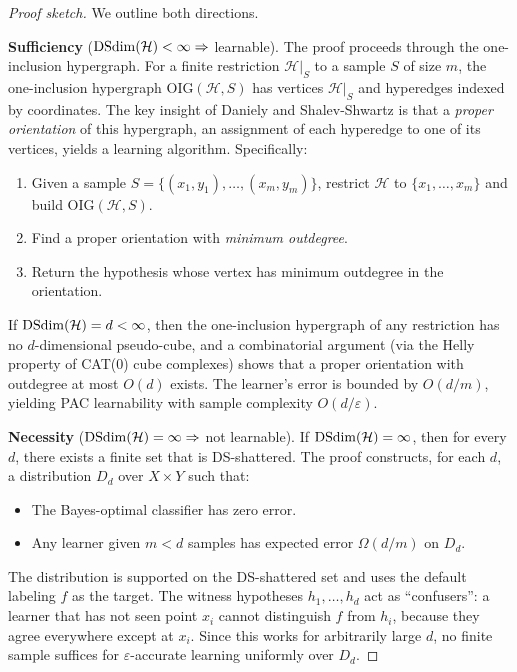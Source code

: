 \begin{proof}[Proof sketch]
We outline both directions.

\medskip\noindent
\textbf{Sufficiency} ($\mathrm{DSdim}(\mathcal{H}) < \infty \Rightarrow$ learnable).
The proof proceeds through the one-inclusion hypergraph.  For a finite
restriction $\mathcal{H}|_S$ to a sample $S$ of size $m$, the one-inclusion
hypergraph $\mathrm{OIG}(\mathcal{H}, S)$ has vertices $\mathcal{H}|_S$ and
hyperedges indexed by coordinates.  The key insight of Daniely and
Shalev-Shwartz is that a \emph{proper orientation} of this hypergraph, an
assignment of each hyperedge to one of its vertices, yields a learning
algorithm.  Specifically:

\begin{enumerate}[leftmargin=*,nosep]
\item Given a sample $S = \{(x_1, y_1), \ldots, (x_m, y_m)\}$, restrict
  $\mathcal{H}$ to $\{x_1, \ldots, x_m\}$ and build $\mathrm{OIG}(\mathcal{H}, S)$.
\item Find a proper orientation with \emph{minimum outdegree}.
\item Return the hypothesis whose vertex has minimum outdegree in the
  orientation.
\end{enumerate}

If $\mathrm{DSdim}(\mathcal{H}) = d < \infty$, then the one-inclusion hypergraph
of any restriction has no $d$-dimensional pseudo-cube, and a combinatorial
argument (via the Helly property of CAT(0) cube complexes) shows that
a proper orientation with outdegree at most $O(d)$ exists.  The learner's
error is bounded by $O(d/m)$, yielding PAC learnability with sample
complexity $O(d/\varepsilon)$.

\medskip\noindent
\textbf{Necessity} ($\mathrm{DSdim}(\mathcal{H}) = \infty \Rightarrow$ not learnable).
If $\mathrm{DSdim}(\mathcal{H}) = \infty$, then for every $d$, there exists a
finite set that is DS-shattered.  The proof constructs, for each $d$, a
distribution $D_d$ over $X \times Y$ such that:
\begin{itemize}[leftmargin=*,nosep]
\item The Bayes-optimal classifier has zero error.
\item Any learner given $m < d$ samples has expected error
  $\Omega(d/m)$ on $D_d$.
\end{itemize}
The distribution is supported on the DS-shattered set and uses the default
labeling $f$ as the target.  The witness hypotheses $h_1, \ldots, h_d$ act
as ``confusers'': a learner that has not seen point $x_i$ cannot distinguish
$f$ from $h_i$, because they agree everywhere except at $x_i$.  Since this
works for arbitrarily large $d$, no finite sample suffices for
$\varepsilon$-accurate learning uniformly over $D_d$.
\end{proof}


